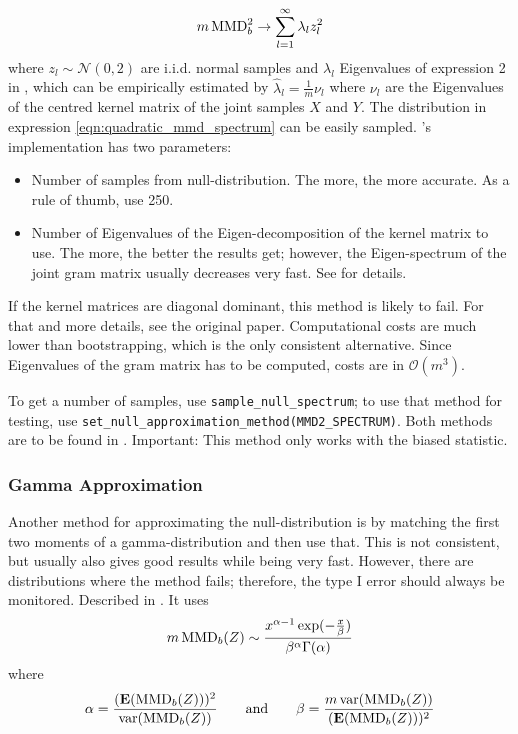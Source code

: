 \begin{align}
\label{eqn:quadratic_mmd_spectrum}
m\operatorname{MMD}^2_b \rightarrow \sum_{l=1}^\infty \lambda_l z_l^2
\end{align}
where $z_l\sim \mathcal{N}(0,2)$ are i.i.d. normal samples and $\lambda_l$
Eigenvalues of expression 2 in \citep{Gretton2012b}, which can be empirically
estimated by $\hat\lambda_l=\frac{1}{m}\nu_l$ where $\nu_l$ are the Eigenvalues
of the centred kernel matrix of the joint samples $X$ and $Y$. The distribution
in expression \ref{eqn:quadratic_mmd_spectrum} can be easily sampled. \shogun{}'s implementation has two parameters:
\begin{itemize}
\item Number of samples from null-distribution. The more, the more accurate. As a rule of thumb, use 250.
\item Number of Eigenvalues of the Eigen-decomposition of the kernel matrix to use. The more, the better the results get; however, the Eigen-spectrum of the joint gram matrix usually decreases very fast. See \citep{Gretton2012b} for details.
\end{itemize}
If the kernel matrices are diagonal dominant, this method is likely to fail. For that and more details, see the original paper. Computational costs are much lower than bootstrapping, which is the only consistent alternative. Since Eigenvalues of the gram matrix has to be computed, costs are in $\mathcal{O}(m^3)$.

To get a number of samples, use \texttt{sample\_null\_spectrum}; to use that method for testing, use \texttt{set\_null\_approximation\_method(MMD2\_SPECTRUM)}. Both methods are to be found in . Important: This method only works with the biased statistic.
\subsubsection{Gamma Approximation}
Another method for approximating the null-distribution is by matching the first two moments of a gamma-distribution and then use that. This is not consistent, but usually also gives good results while being very fast. However, there are distributions where the method fails; therefore, the type I error should always be monitored. Described in \citep{Gretton2012b}. It uses
\begin{align}
\label{eqn:quadratic_mmd_gamma}
m\operatorname{MMD}_b(Z) \sim \frac{x^{\alpha-1}\exp(-\frac{x}{\beta})}{\beta^\alpha \Gamma(\alpha)}
\end{align}
where
\begin{align*}
\alpha=\frac{(\textbf{E}(\text{MMD}_b(Z)))^2}{\operatorname{var}(\text{MMD}_b(Z))} \qquad \text{and} \qquad
 \beta=\frac{m \operatorname{var}(\text{MMD}_b(Z))}{(\textbf{E}(\text{MMD}_b(Z)))^2}
\end{align*}


